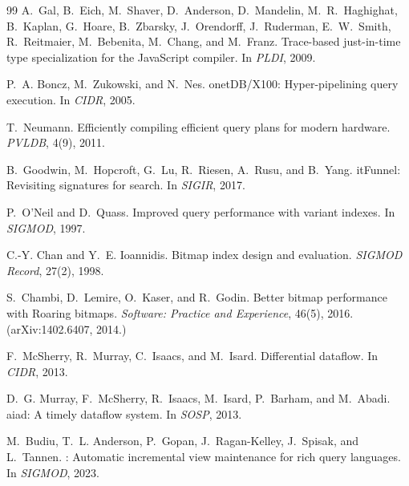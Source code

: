 \documentclass[10pt]{article}
\begin{document}
\begin{thebibliography}{99}
A.~Gal, B.~Eich, M.~Shaver, D.~Anderson, D.~Mandelin, M.~R.~Haghighat,
B.~Kaplan, G.~Hoare, B.~Zbarsky, J.~Orendorff, J.~Ruderman, E.~W.~Smith,
R.~Reitmaier, M.~Bebenita, M.~Chang, and M.~Franz.
\newblock Trace-based just-in-time type specialization for the {J}ava{S}cript
  compiler.
\newblock In \emph{PLDI}, 2009.

P.~A. Boncz, M.~Zukowski, and N.~Nes.
onet{DB}/{X100}: Hyper-pipelining query execution.
\newblock In \emph{CIDR}, 2005.

T.~Neumann.
\newblock Efficiently compiling efficient query plans for modern hardware.
\newblock \emph{PVLDB}, 4(9), 2011.

B.~Goodwin, M.~Hopcroft, G.~Lu, R.~Riesen, A.~Rusu, and B.~Yang.
it{F}unnel: Revisiting signatures for search.
\newblock In \emph{SIGIR}, 2017.

P.~O'Neil and D.~Quass.
\newblock Improved query performance with variant indexes.
\newblock In \emph{SIGMOD}, 1997.

C.-Y. Chan and Y.~E. Ioannidis.
\newblock Bitmap index design and evaluation.
\newblock \emph{SIGMOD Record}, 27(2), 1998.

S.~Chambi, D.~Lemire, O.~Kaser, and R.~Godin.
\newblock Better bitmap performance with {R}oaring bitmaps.
\newblock \emph{Software: Practice and Experience}, 46(5), 2016.
  (arXiv:1402.6407, 2014.)

F.~McSherry, R.~Murray, C.~Isaacs, and M.~Isard.
\newblock Differential dataflow.
\newblock In \emph{CIDR}, 2013.

D.~G. Murray, F.~McSherry, R.~Isaacs, M.~Isard, P.~Barham, and M.~Abadi.
aiad: A timely dataflow system.
\newblock In \emph{SOSP}, 2013.

M.~Budiu, T.~L. Anderson, P.~Gopan, J.~Ragan-Kelley, J.~Spisak, and L.~Tannen.
: Automatic incremental view maintenance for rich query
  languages.
\newblock In \emph{SIGMOD}, 2023.


\end{thebibliography}
\end{document}
